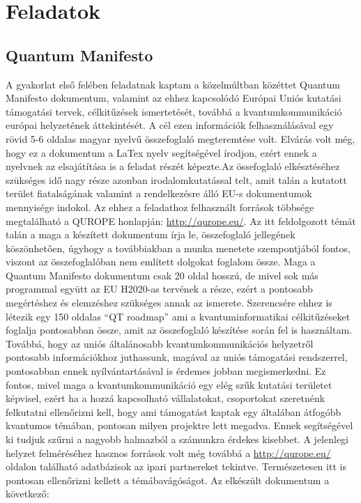\section*{Feladatok}

\subsection *{Quantum Manifesto}

A gyakorlat első felében feladatnak kaptam a közelmúltban közéttet Quantum Manifesto dokumentum, valamint az ehhez kapcsolódó Európai Uniós kutatási támogatási tervek, célkitűzések ismertetését, továbbá a kvantumkommunikáció európai helyzetének áttekintését. A cél ezen információk felhasználásával egy rövid 5-6 oldalas magyar nyelvű összefoglaló megteremtése volt. Elvárás volt még, hogy ez a dokumentum a LaTex nyelv segítségével írodjon, ezért ennek a nyelvnek az elsajátítása is a feladat részét képezte.Az össefoglaló elkésztéséhez szükséges idő nagy része azonban irodalomkutatással telt, amit talán a kutatott terület fiatalságának valamint a rendelkezésre álló EU-s dokumentumok mennyisége indokol. Az ehhez a feladathoz felhasznált források többsége megtalálható a QUROPE honlapján: \url{http://qurope.eu/}. Az itt feldolgozott témát talán a maga a készített dokumentum írja le, összefoglaló jellegének köszönhetően, úgyhogy a továbbiakban a munka menetete szempontjából fontos, viszont az összefoglalóban nem említett dolgokat foglalom össze. Maga a Quantum Manifesto dokumentum csak 20 oldal hosszú, de mivel sok más programmal együtt az EU H2020-as tervének a része, ezért a pontosabb megértéshez és elemzéshez szükséges annak az ismerete. Szerencsére ehhez is létezik egy 150 oldalas ``QT roadmap'' ami a kvantuminformatikai célkitűzéseket foglalja pontosabban össze, amit az összefoglaló készítése során fel is használtam. Továbbá, hogy az uniós általánosabb kvantumkommunikációs helyzetről pontosabb információkhoz juthassunk, magával az uniós támogatási rendszerrel, pontosabban ennek nyílvántartásával is érdemes jobban megismerkedni. Ez fontos, mivel maga a kvantumkommunikáció egy elég szűk kutatási területet képvisel, ezért ha a hozzá kapcsolható vállalatokat, csoportokat szeretnénk felkutatni ellenőrizni kell, hogy ami támogatást kaptak egy általában átfogóbb kvantumos témában, pontosan milyen projektre lett megadva. Ennek segítségével ki tudjuk szűrni a nagyobb halmazból a számunkra érdekes kisebbet.
A jelenlegi helyzet felméréséhez hasznos források volt még továbbá a  \url{http://qurope.eu/} oldalon található adatbázisok az ipari partnereket tekintve. Természetesen itt is pontosan ellenőrizni kellett a témábavágóságot. Az elkészült dokumentum a következő:



